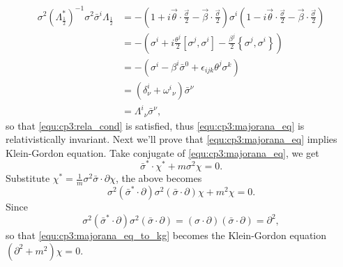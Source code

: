 \begin{problembody}
\begin{align*}
        \sigma^2(\Lambda_{\frac{1}{2}}^\ast)^{-1}\sigma^2\bar{\sigma}^i \Lambda_{\frac{1}{2}}
        & = -\left(1 + i\vec{\theta}\cdot\frac{\vec{\sigma}}{2} - \vec{\beta}\cdot\frac{\vec{\sigma}}{2}\right)
        \sigma^i
        \left(1 - i\vec{\theta}\cdot\frac{\vec{\sigma}}{2} - \vec{\beta}\cdot\frac{\vec{\sigma}}{2}\right) \\
        & = -\left(\sigma^i + i\frac{\theta^j}{2}\left[\sigma^j, \sigma^i\right] - \frac{\beta^j}{2}\left\{\sigma^j, \sigma^i\right\}\right)\\
        & = -\left(\sigma^i - \beta^i\bar{\sigma}^0 + \epsilon_{ijk}\theta^j\sigma^k\right)\\
        & = \left(\delta^i_\nu + \omega^i{}_\nu\right) \bar{\sigma}^\nu\\
        & = \Lambda^i{}_\nu \bar{\sigma}^\nu,
    \end{align*}
    so that \eqref{equ:cp3:rela_cond} is satisfied, thus \eqref{equ:cp3:majorana_eq} is relativistically invariant.
    Next we'll prove that \eqref{equ:cp3:majorana_eq} implies Klein-Gordon equation. Take conjugate of \eqref{equ:cp3:majorana_eq}, we get
    \begin{equation*}
        \bar{\sigma}^\ast \cdot \chi^\ast + m\sigma^2\chi = 0.
    \end{equation*}
    Substitute $\chi^\ast = \frac{1}{m}\sigma^2\bar{\sigma}\cdot\partial\chi$, the above becomes
    \begin{equation}\label{equ:cp3:majorana_eq_to_kg}
        \sigma^2 (\bar{\sigma}^\ast \cdot \partial) \sigma^2 (\bar{\sigma} \cdot \partial) \chi + m^2 \chi = 0.
    \end{equation}
    Since 
    \begin{equation*}
        \sigma^2 (\bar{\sigma}^\ast \cdot \partial) \sigma^2 (\bar{\sigma} \cdot \partial) = (\sigma\cdot\partial)(\bar{\sigma}\cdot\partial) = \partial^2,
    \end{equation*}
    so that \eqref{equ:cp3:majorana_eq_to_kg} becomes the Klein-Gordon equation $(\partial^2 + m^2)\chi = 0$.


\end{problembody}

